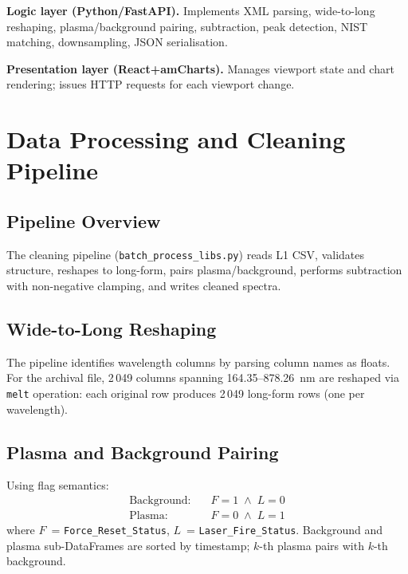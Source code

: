 \documentclass[a4paper,twocolumn,10pt]{article}
\begin{document}
\textbf{Logic layer (Python/FastAPI).} Implements XML parsing,
wide-to-long reshaping, plasma/background pairing, subtraction, peak
detection, NIST matching, downsampling, JSON serialisation.

\textbf{Presentation layer (React+amCharts).} Manages viewport state
and chart rendering; issues HTTP requests for each viewport change.

\section{Data Processing and Cleaning Pipeline}
\label{sec:processing}

\subsection{Pipeline Overview}

The cleaning pipeline (\texttt{batch\_process\_libs.py}) reads L1 CSV,
validates structure, reshapes to long-form, pairs plasma/background,
performs subtraction with non-negative clamping, and writes cleaned
spectra.

\subsection{Wide-to-Long Reshaping}

The pipeline identifies wavelength columns by parsing column names as
floats. For the archival file, 2\,049 columns spanning
164.35--878.26~nm are reshaped via \texttt{melt} operation: each
original row produces 2\,049 long-form rows (one per wavelength).

\subsection{Plasma and Background Pairing}

Using flag semantics:
\begin{align}
\label{eq:bg_mask}
\text{Background:}\quad & F = 1 \;\wedge\; L = 0 \\
\label{eq:plasma_mask}
\text{Plasma:}\quad & F = 0 \;\wedge\; L = 1
\end{align}
where $F$~= \texttt{Force\_Reset\_Status}, $L$~=
\texttt{Laser\_Fire\_Status}. Background and plasma sub-DataFrames are
sorted by timestamp; $k$-th plasma pairs with $k$-th background.
\end{document}
